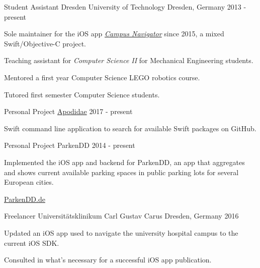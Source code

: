 

\begin{cventries}

\cventry
	{Student Assistant}
	{Dresden University of Technology}
	{Dresden, Germany}
	{2013 - present}
	{
		\begin{cvitems}
			\item {Sole maintainer for the iOS app \href{https://navigator.tu-dresden.de/mobile_apps}{\emph{Campus Navigator}} since 2015, a mixed Swift/Objective-C project.}
			\item {Teaching assistant for \emph{Computer Science II} for Mechanical Engineering students.}
			\item {Mentored a first year Computer Science LEGO robotics course.}
			\item {Tutored first semester Computer Science students.}
		\end{cvitems}
	}
	
\cventry
	{Personal Project}
	{\href{https://github.com/kiliankoe/apodidae}{Apodidae}}
	{}
	{2017 - present}
	{
		\begin{cvitems}
			\item {Swift command line application to search for available Swift packages on GitHub.}
		\end{cvitems}
	}
	
\cventry
	{Personal Project}
	{ParkenDD}
	{}
	{2014 - present}
	{
		\begin{cvitems}
			\item {Implemented the iOS app and backend for ParkenDD, an app that aggregates and shows current available parking spaces in public parking lots for several European cities.}
			\item {\href{https://parkendd.de}{ParkenDD.de}}
		\end{cvitems}
	}
	
\cventry
	{Freelancer}
	{Universitätsklinikum Carl Gustav Carus}
	{Dresden, Germany}
	{2016}
	{
		\begin{cvitems}
			\item {Updated an iOS app used to navigate the university hospital campus to the current iOS SDK.}
			\item {Consulted in what's necessary for a successful iOS app publication.}
		\end{cvitems}
	}
	

\end{cventries}
